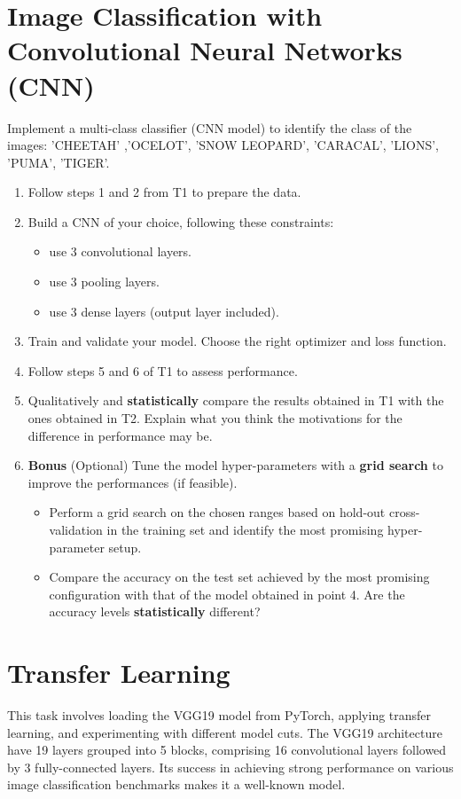 \documentclass[11pt]{scrartcl}
\begin{document}
\section{Image Classification with Convolutional Neural Networks (CNN)}

Implement a multi-class classifier (CNN model) to identify the class of the images: 'CHEETAH' ,'OCELOT', 'SNOW LEOPARD', 'CARACAL', 'LIONS', 'PUMA', 'TIGER'.

\begin{enumerate}
\item Follow steps 1 and 2 from T1 to prepare the data.
\item Build a CNN of your choice, following these constraints: 
\begin{itemize}
\item use 3 convolutional layers.
\item use 3 pooling layers.
\item use 3 dense layers (output layer included).
\end{itemize}
\item Train and validate your model. Choose the right optimizer and loss function. 
\item Follow steps 5 and 6 of T1 to assess performance.
\item Qualitatively and \textbf{statistically} compare the results obtained in T1 with the ones obtained in T2. Explain what you think the motivations for the difference in performance may be.
\item \textbf{Bonus} (Optional) Tune the model hyper-parameters with a \textbf{grid search} to improve the performances (if feasible).
\begin{itemize}
\item Perform a grid search on the chosen ranges based on hold-out cross-validation in the training set and identify the most promising hyper-parameter setup.
\item Compare the accuracy on the test set achieved by the most promising configuration with that of the model obtained in point 4. Are the accuracy levels \textbf{statistically} different?
\end{itemize}
\end{enumerate}

\newpage
\section{Transfer Learning}

This task involves loading the VGG19 model from PyTorch, applying transfer learning, and experimenting with different model cuts. The VGG19 architecture have 19 layers grouped into 5 blocks, comprising 16 convolutional layers followed by 3 fully-connected layers. Its success in achieving strong performance on various image classification benchmarks makes it a well-known model.
\end{document}
